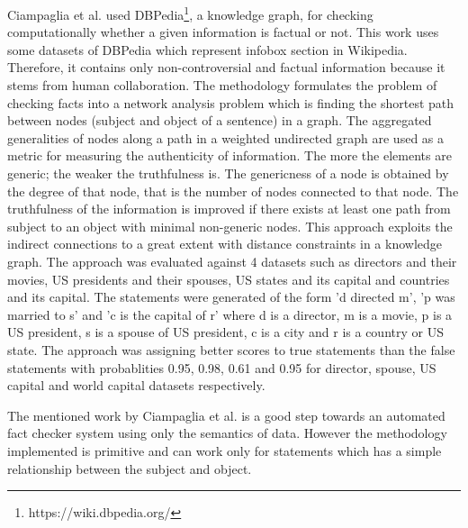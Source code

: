 \documentclass[a4paper, 11pt]{article}
\begin{document}
Ciampaglia et al. \cite{Ciampaglia2015} used DBPedia\footnote{https://wiki.dbpedia.org/}, a knowledge graph, for checking computationally whether a given information is factual or not. This work uses some datasets of DBPedia which represent infobox section in Wikipedia. Therefore, it contains only non-controversial and factual information because it stems from human collaboration. The methodology formulates the problem of checking facts into a network analysis problem which is finding the shortest path between nodes (subject and object of a sentence) in a graph. The aggregated generalities of nodes along a path in a weighted undirected graph are used as a metric for measuring the authenticity of information. The more the elements are generic; the weaker the truthfulness is.  The genericness of a node is obtained by the degree of that node, that is the number of nodes connected to that node. The truthfulness of the information is improved if there exists at least one path from subject to an object with minimal non-generic nodes. This approach exploits the indirect connections to a great extent with distance constraints in a knowledge graph. The approach was evaluated against 4 datasets such as directors and their movies, US presidents and their spouses, US states and its capital and countries and its capital. The statements were generated of the form 'd directed m', 'p was married to s' and 'c is the capital of r' where d is a director, m is a movie, p is a US president, s is a spouse of US president, c is a city and r is a country or US state. The approach was assigning better scores to true statements than the false statements with probablities 0.95, 0.98, 0.61 and 0.95 for director, spouse, US capital and world capital datasets respectively.

The mentioned work by Ciampaglia et al. is a good step towards an automated fact checker system using only the semantics of data. However the methodology implemented is primitive and can work only for statements which has a simple relationship between the subject and object.





\end{document}
